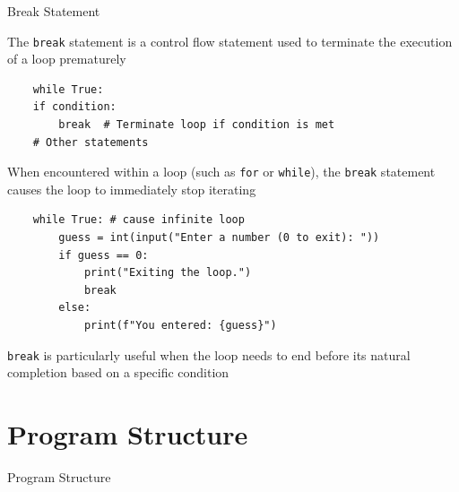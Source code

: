 \documentclass[
	11pt, 
]{beamer}
\begin{document}

\begin{frame}[fragile]{Break Statement}

The \texttt{break} statement is a control flow statement used to terminate the execution of a loop prematurely

\begin{verbatim}
    while True:
    if condition:
        break  # Terminate loop if condition is met
    # Other statements
\end{verbatim}

When encountered within a loop (such as \texttt{for} or \texttt{while}), the \texttt{break} statement causes the loop to immediately stop iterating

\begin{verbatim}
    while True: # cause infinite loop
        guess = int(input("Enter a number (0 to exit): "))
        if guess == 0:
            print("Exiting the loop.")
            break
        else:
            print(f"You entered: {guess}")
\end{verbatim}

\texttt{break} is particularly useful when the loop needs to end before its natural completion based on a specific condition

\end{frame}


\section{Program Structure}
\begin{frame}[fragile]{Program Structure}


\end{frame}


\end{document}
